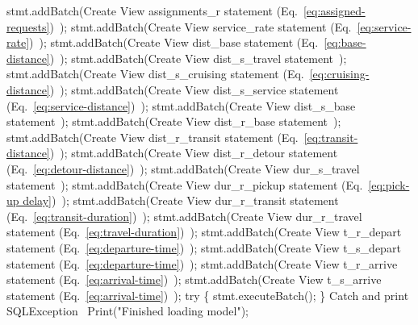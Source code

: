\documentclass{article}
\def\nwendcode{\endtrivlist \endgroup}
\let\nwdocspar=\par
\theoremstyle{definition}
\begin{document}
stmt.addBatch(\LA{}Create View assignments\_r statement (Eq.~\ref{eq:assigned-requests})~{\nwtagstyle{}}\RA{});
stmt.addBatch(\LA{}Create View service\_rate statement (Eq.~\ref{eq:service-rate})~{\nwtagstyle{}}\RA{});
stmt.addBatch(\LA{}Create View dist\_base statement (Eq.~\ref{eq:base-distance})~{\nwtagstyle{}}\RA{});
stmt.addBatch(\LA{}Create View dist\_s\_travel statement~{\nwtagstyle{}}\RA{});
stmt.addBatch(\LA{}Create View dist\_s\_cruising statement (Eq.~\ref{eq:cruising-distance})~{\nwtagstyle{}}\RA{});
stmt.addBatch(\LA{}Create View dist\_s\_service statement (Eq.~\ref{eq:service-distance})~{\nwtagstyle{}}\RA{});
stmt.addBatch(\LA{}Create View dist\_s\_base statement~{\nwtagstyle{}}\RA{});
stmt.addBatch(\LA{}Create View dist\_r\_base statement~{\nwtagstyle{}}\RA{});
stmt.addBatch(\LA{}Create View dist\_r\_transit statement (Eq.~\ref{eq:transit-distance})~{\nwtagstyle{}}\RA{});
stmt.addBatch(\LA{}Create View dist\_r\_detour statement (Eq.~\ref{eq:detour-distance})~{\nwtagstyle{}}\RA{});
stmt.addBatch(\LA{}Create View dur\_s\_travel statement~{\nwtagstyle{}}\RA{});
stmt.addBatch(\LA{}Create View dur\_r\_pickup statement (Eq.~\ref{eq:pick-up delay})~{\nwtagstyle{}}\RA{});
stmt.addBatch(\LA{}Create View dur\_r\_transit statement (Eq.~\ref{eq:transit-duration})~{\nwtagstyle{}}\RA{});
stmt.addBatch(\LA{}Create View dur\_r\_travel statement (Eq.~\ref{eq:travel-duration})~{\nwtagstyle{}}\RA{});
stmt.addBatch(\LA{}Create View t\_r\_depart statement (Eq.~\ref{eq:departure-time})~{\nwtagstyle{}}\RA{});
stmt.addBatch(\LA{}Create View t\_s\_depart statement (Eq.~\ref{eq:departure-time})~{\nwtagstyle{}}\RA{});
stmt.addBatch(\LA{}Create View t\_r\_arrive statement (Eq.~\ref{eq:arrival-time})~{\nwtagstyle{}}\RA{});
stmt.addBatch(\LA{}Create View t\_s\_arrive statement (Eq.~\ref{eq:arrival-time})~{\nwtagstyle{}}\RA{});
try \{
  stmt.executeBatch();
\}
\LA{}Catch and print \code{}SQLException\edoc{}~{\nwtagstyle{}}\RA{}
Print("Finished loading model");
\nwendcode{}\nwdocspar
\end{document}
